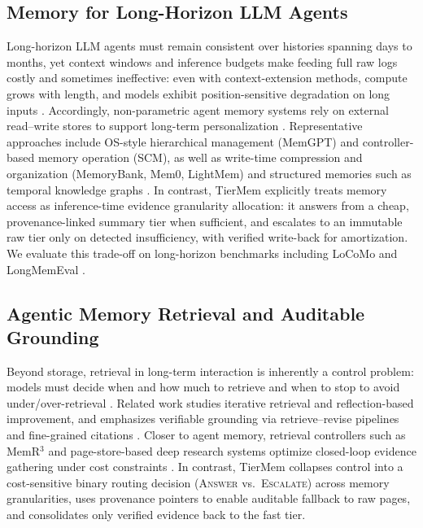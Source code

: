 \documentclass{article}
\theoremstyle{plain}
\theoremstyle{definition}
\theoremstyle{remark}
\begin{document}
\subsection{Memory for Long-Horizon LLM Agents}
Long-horizon LLM agents must remain consistent over histories spanning days to months, yet context windows and inference budgets make feeding full raw logs costly and sometimes ineffective: even with context-extension methods, compute grows with length, and models exhibit position-sensitive degradation on long inputs \cite{chen_extending_2023,liu_lost_2023}.
Accordingly, non-parametric agent memory systems rely on external read--write stores to support long-term personalization \cite{yehudai_survey_2025}.
Representative approaches include OS-style hierarchical management (MemGPT) and controller-based memory operation (SCM), as well as write-time compression and organization (MemoryBank, Mem0, LightMem) and structured memories such as temporal knowledge graphs \cite{packer_memgpt_2024,wang_scm_2023,zhong_memorybank_2023,chhikara_mem0_2025,fang_lightmem_2025,rasmussen_zep_2025}.
In contrast, TierMem explicitly treats memory access as inference-time evidence granularity allocation: it answers from a cheap, provenance-linked summary tier when sufficient, and escalates to an immutable raw tier only on detected insufficiency, with verified write-back for amortization.
We evaluate this trade-off on long-horizon benchmarks including LoCoMo and LongMemEval \cite{maharana_evaluating_2024,wu_longmemeval_2025}.

\subsection{Agentic Memory Retrieval and Auditable Grounding}
Beyond storage, retrieval in long-term interaction is inherently a control problem: models must decide when and how much to retrieve and when to stop to avoid under/over-retrieval \cite{asai_self-rag_2023,jiang_active_2023}.
Related work studies iterative retrieval and reflection-based improvement, \cite{shinn_reflexion_2023} and emphasizes verifiable grounding via retrieve--revise pipelines and fine-grained citations \cite{gao_rarr_2022,cao_verifiable_2024}.
Closer to agent memory, retrieval controllers such as MemR$^3$ and page-store-based deep research systems optimize closed-loop evidence gathering under cost constraints \cite{du_memr3_2025,yan_general_2025}.
In contrast, TierMem collapses control into a cost-sensitive binary routing decision (\textsc{Answer} vs.\ \textsc{Escalate}) across memory granularities, uses provenance pointers to enable auditable fallback to raw pages, and consolidates only verified evidence back to the fast tier.
\end{document}
